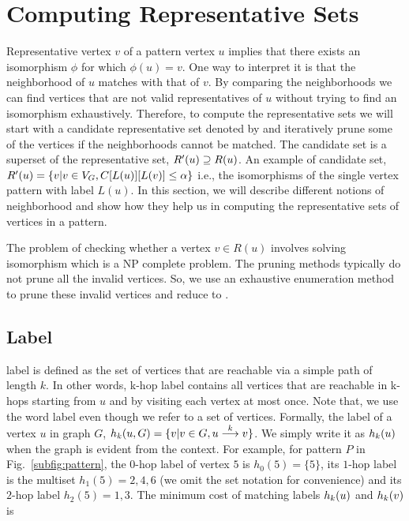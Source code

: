 
\section{Computing Representative Sets} Representative vertex $v$ of a pattern
vertex $u$ implies that there exists an isomorphism $\phi$ for which $\phi(u) =
v$.  One way to interpret it is that the neighborhood of $u$ matches with that
of $v$.  By comparing the neighborhoods we can find vertices that are not valid
representatives of $u$ without trying to find an isomorphism exhaustively.
Therefore, to compute the representative sets we will start with a candidate
representative set denoted by \CR  and iteratively prune some of the vertices if
the neighborhoods cannot be matched.  The candidate set is a superset of the
representative set, $\CR \supseteq \RS$.  An example of candidate set, $ \CR =
\{v| v \in \vg, \matij{C}{L(u)}{L(v)} \leq \alpha \}$ i.e., the isomorphisms of
the single vertex pattern with label $L(u)$.  In this section, we will describe
different notions of neighborhood and show how they help us in computing the
representative sets of vertices in a pattern.

The problem of checking whether a vertex $v \in R(u)$ involves solving
isomorphism which is a NP complete problem. The pruning methods typically do not
prune all the invalid vertices.  So, we use an exhaustive enumeration method to
prune these invalid vertices and reduce \CR to \RS.

 \subsection{\khop Label}
 \khop label is defined as the set of vertices that are reachable via a simple
 path of length $k$.  In other words, k-hop label contains all vertices that are
 reachable in k-hops starting from $u$ and by visiting each vertex at most once.
 Note that, we use the word label even though we refer to a set of vertices.
 Formally, the \khop label of a vertex $u$ in graph $G$, $\khopl{k}{u,G} = \{v |
 v \in G, \kpath{u}{v}{k}\}$.  We simply write it as $\khopl{k}{u}$ when the
 graph is evident from the context.  For example, for pattern $P$ in
 Fig.~\ref{subfig:pattern}, the $0$-hop label of vertex $5$ is $h_0(5) = \{5\}$,
 its $1$-hop label is the multiset $h_1(5) = 2, 4, 6$ (we omit the set notation
 for convenience) and its $2$-hop label $h_2(5) = 1, 3$. The minimum cost of
 matching \khop labels $\khopl{k}{u}$ and $\khopl{k}{v}$ is 

